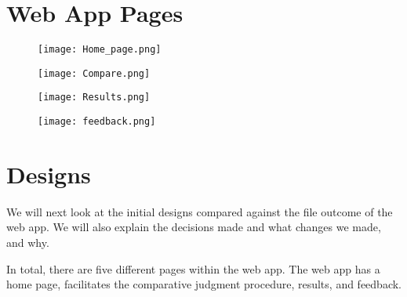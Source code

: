 \chapter{Web App Pages}
\label{app:web_designs}

\begin{figure}[h]
	\centering
	\texttt{[image: Home\_page.png]}
	\caption{}
	
		
	\end{figure} 
\begin{figure}[h]
	\centering
	\texttt{[image: Compare.png]}
	\caption{}
	
		
	\end{figure} 

\begin{figure}[h]
	\centering
	\texttt{[image: Results.png]}
	\caption{}
	
		
	\end{figure} 


		
\begin{figure}[h]
	\centering
	\texttt{[image: feedback.png]}
	\caption{}
		
	\end{figure} 

	


	

\chapter{Designs}
We will next look at the initial designs compared against the file outcome of the web app. We will also explain the decisions made and what changes we made, and why. 

In total, there are five different pages within the web app. The web app has a home page, facilitates the comparative judgment procedure, results, and feedback.


